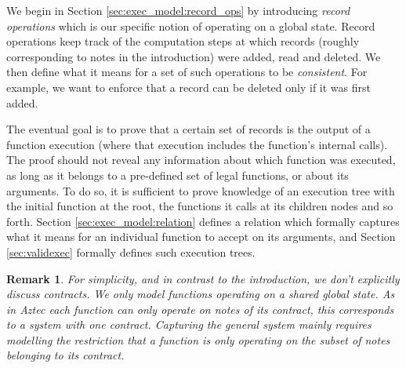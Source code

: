 \documentclass[11pt]{article} %
\newtheorem{remark}[lemma]{Remark}
\begin{document}
We begin in Section \ref{sec:exec_model:record_ops} by introducing \emph{record operations} which is our specific notion of operating on a global state.
Record operations keep track of the computation steps at which	records (roughly corresponding to notes in the introduction) were added, read and deleted. 
We then define what it means for a set of such operations to be \emph{consistent}. For example, we want to enforce that a record can be deleted only if it was first added. 

	The eventual goal is to prove that a certain set of records is the output of a function execution (where that execution includes the function's internal calls).
	The proof should not reveal any information about which function was executed, as long as it belongs to a pre-defined set of legal functions,
	or about its arguments.
	To do so, it is sufficient to prove knowledge of an execution tree with the initial function at the root, the functions it calls at its children nodes and so forth. 
	Section \ref{sec:exec_model:relation} defines a relation which formally captures what it means for an individual function to accept on its arguments,
	and Section \ref{sec:validexec} formally defines such execution trees.

\begin{remark}
For simplicity, and in contrast to the introduction, we don't explicitly discuss contracts. We only model functions operating on a shared global state.
As in Aztec each function can only operate on notes of its contract, this corresponds to a system with one contract. Capturing the general system mainly requires modelling the restriction that a function is only operating on the subset of notes belonging to its contract.
\end{remark}
\end{document}
